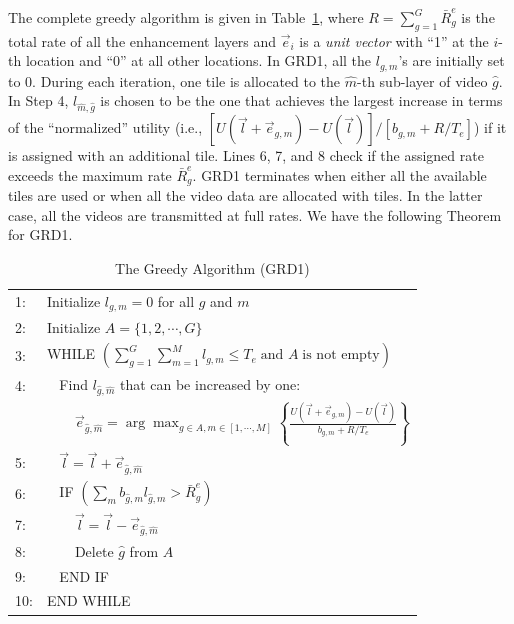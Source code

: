 \documentclass[12pt,onecolumn,draftclsnofoot]{IEEEtran} %
\begin{document}
The complete greedy algorithm is given in Table~\ref{tab:GreedyAlgo1}, where $R=\sum_{g=1}^G \bar{R}_g^e$ is the total rate of all the enhancement layers and $\vec{e}_{i}$ is a {\em unit vector} with ``1'' at the $i$-th location and ``0'' at all other locations.  In GRD1, all the $l_{g,m}$'s are initially set to 0. During each iteration, one tile is allocated to the $\hat{m}$-th sub-layer of video $\hat{g}$.  In Step 4, $l_{\hat{m},  \hat{g}}$ is chosen to be the one that achieves the largest increase in terms of the ``normalized'' utility (i.e., $[U(\vec{l}+\vec{e}_{g,m})-U(\vec{l})]/[b_{g,m}+R/T_e]$) if it is assigned with an additional tile.  Lines 6, 7, and 8 check if the assigned rate exceeds the maximum rate $\bar{R}^e_g$.  GRD1 terminates when either all the available tiles are used or when all the video data are allocated with tiles. In the latter case, all the videos are transmitted at full rates.  We have the following Theorem for GRD1.  
\begin{table} [!t]
\begin{center}
\caption{The Greedy Algorithm (GRD1)}
\begin{tabular}{ll}
\hline
1:  & Initialize $l_{g,m}=0$ for all $g$ and $m$ \\
2:  & Initialize $A=\{1,2,\cdots,G\}$\\
3:  & WHILE $\left( \sum_{g=1}^G\sum_{m=1}^Ml_{g,m} \le T_e \; \mbox{and } A \; 
         \mbox{is not empty} \right)$ \\
4:  & $\;\;$ Find $l_{\hat{g},\hat{m}}$ that can be increased by one: \\
    & $\;\;\;\;\;\;$ $\vec{e}_{\hat{g},\hat{m}}=\arg \max_{g \in A,m \in [1,\cdots,M]} \left\{ \frac{U(\vec{l}+\vec{e}_{g,m})-U(\vec{l})}{b_{g,m}+R/T_e} \right\}$ \\
5:  & $\;\;$ $\vec{l}=\vec{l}+\vec{e}_{\hat{g},\hat{m}}$  \\
6:  & $\;\;$ IF $\left( \sum_m b_{\hat{g},m}l_{\hat{g},m} > \bar{R}_g^e \right)$ \\
7:  & $\;\;\;\;\;\;$ $\vec{l}=\vec{l}-\vec{e}_{\hat{g},\hat{m}}$  \\
8:  & $\;\;\;\;\;\;$ Delete $\hat{g}$ from $A$ \\
9:  & $\;\;$ END IF \\
10: & END WHILE \\
\hline
\end{tabular}
\label{tab:GreedyAlgo1}
\end{center}
\end{table}
\end{document}
